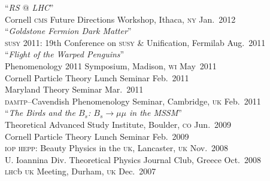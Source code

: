 \documentclass[margin,line]{resume}
\newcommand{\mytalksep}{-.1mm}
\newcommand{\mytalkskip}{2mm}
\newcommand{\scap}[1]{\textsc{\MakeLowercase{#1}}}
\begin{document}
\begin{resume}
%
%
``\emph{RS $@$ LHC}'' 
\vspace{\mytalksep}\\ 
Cornell \scap{CMS} Future Directions Workshop, Ithaca, \scap{NY}
\hfill %
Jan.~2012\vspace{\mytalkskip}\\ 
%
%
%
``\emph{Goldstone Fermion Dark Matter}'' 
\vspace{\mytalksep}\\ 
\scap{SUSY} 2011: 19th Conference on \scap{SUSY} \& Unification, Fermilab
\hfill %
Aug.~2011\vspace{\mytalkskip}\\ 
%
%
%
``\emph{Flight of the Warped Penguins}'' 
\vspace{\mytalksep}\\ 
Phenomenology 2011 Symposium, Madison, \scap{WI}
\hfill %
May~2011\vspace{\mytalksep}\\ 
Cornell Particle Theory Lunch Seminar
\hfill %
Feb.~2011\vspace{\mytalksep}\\   
%
Maryland Theory Seminar
\hfill %
Mar.~2011\vspace{\mytalksep}\\   
%
\scap{DAMTP}--Cavendish Phenomenology Seminar, Cambridge, \scap{UK}
\hfill %
Feb.~2011\vspace{\mytalkskip}\\
%
%
%
%
%
%
``\emph{The Birds and the $B_s$: $B_s \to \mu\mu$ in the MSSM}'' 
\vspace{\mytalksep}\\ 
Theoretical Advanced Study Institute, Boulder, \scap{CO}
\hfill %
Jun.~2009\vspace{\mytalksep}\\ 
%
Cornell Particle Theory Lunch Seminar
\hfill %
Feb.~2009\vspace{\mytalksep}\\   
%
\scap{IOP HEPP}: Beauty Physics in the \scap{UK}, Lancaster, \scap{UK}
\hfill %
Nov.~2008\vspace{\mytalksep}\\ 
%
U. Ioannina Div. Theoretical Physics Journal Club, Greece
\hfill %
Oct.~2008\vspace{\mytalksep}\\
%
\scap{LHC}b \scap{UK} Meeting, Durham, \scap{UK}
\hfill %
Dec.~2007%
%
%
%







\end{resume}
\end{document}
